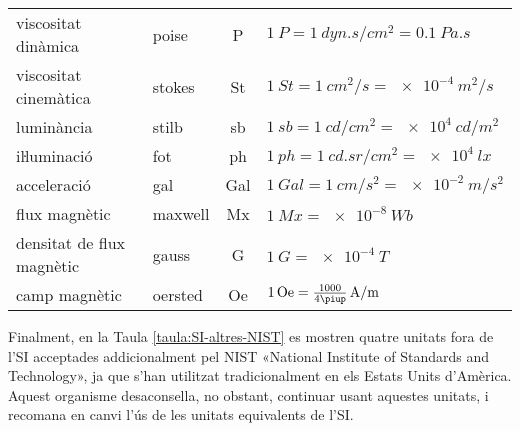 \begin{ThreePartTable}
\begin{longtable}[h]{llcl}
    viscositat dinàmica & poise & \si{P} & $\SI{1}{P} = \SI{1}{dyn.s/cm^2} = \SI{0,1}{Pa.s}$ \\
    viscositat cinemàtica & stokes & \si{St} & $\SI{1}{St} = \SI{1}{cm^2/s} = \SI{e-4}{m^2/s}$ \\
    luminància & stilb & \si{sb} & $\SI{1}{sb} = \SI{1}{cd/cm^2} = \SI{e4}{cd/m^2}$ \\
    iŀluminació & fot & \si{ph} & $\SI{1}{ph} = \SI{1}{cd.sr/cm^2} = \SI{e4}{lx}$ \\
    acceleració & gal & \si{Gal} & $\SI{1}{Gal} = \SI{1}{cm/s^2} = \SI{e-2}{m/s^2}$ \\
    flux magnètic & maxwell & \si{Mx} & $\SI{1}{Mx} = \SI{e-8}{Wb}$ \\
    densitat de flux magnètic & gauss & \si{G} & $\SI{1}{G} = \SI{e-4}{T}$ \\
    camp magnètic & oersted & \si{Oe} & $\SI{1}{Oe} = \frac{1000}{4\piup}\si{\,A/m}$ \\
\bottomrule[1pt]
\end{longtable}
\end{ThreePartTable}


Finalment, en la Taula \vref{taula:SI-altres-NIST} es mostren quatre unitats fora de l'SI acceptades addicionalment pel NIST «National Institute of Standards and Technology», ja que s'han utilitzat tradicionalment en els Estats Units d'Amèrica. Aquest organisme desaconsella, no obstant, continuar usant aquestes unitats, i recomana en canvi l'ús de les unitats equivalents de l'SI.

